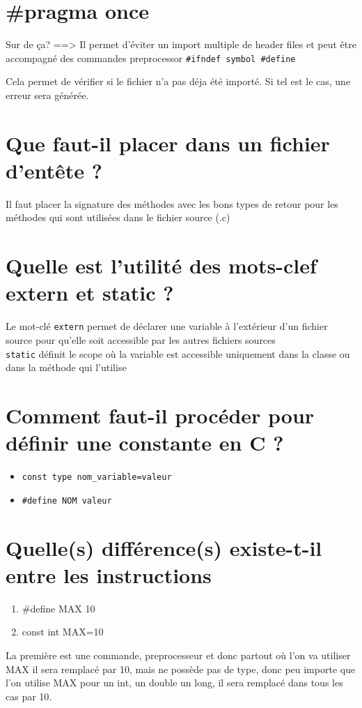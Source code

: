 \section{\#pragma once}
Sur de ça? ==> Il permet d'éviter un import multiple de header files et peut être accompagné des commandes preprocessor \texttt{\#ifndef symbol \#define}

Cela permet de vérifier si le fichier n'a pas déja été importé. Si tel est le cas, une erreur sera générée.

\section{Que faut-il placer dans un fichier d'entête ?}
Il faut placer la signature des méthodes avec les bons types de retour pour les méthodes qui sont utilisées dans le fichier source (.c)

\section{Quelle est l'utilité des mots-clef extern et static ?}
Le mot-clé \texttt{extern} permet de déclarer une variable à l'extérieur d'un fichier source pour qu'elle soit accessible par les autres fichiers sources\\
\texttt{static} définit le scope où la variable est accessible uniquement dans la classe ou dans la méthode qui l'utilise

\section{Comment faut-il procéder pour définir une constante en C ?}
\begin{itemize}
   \item \texttt{const type nom\_variable=valeur}
   \item \texttt{\#define NOM valeur}
\end{itemize}

\section{Quelle(s) différence(s) existe-t-il entre les instructions}
\begin{enumerate}
   \item   \#define MAX 10
   \item const int MAX=10
\end{enumerate}
La première est une commande,  preprocesseur et donc partout où l'on va utiliser MAX il sera remplacé par 10, mais ne possède pas de type, donc peu importe que l'on utilise MAX pour un int, un double un long, il sera remplacé dans tous les cas par 10.

